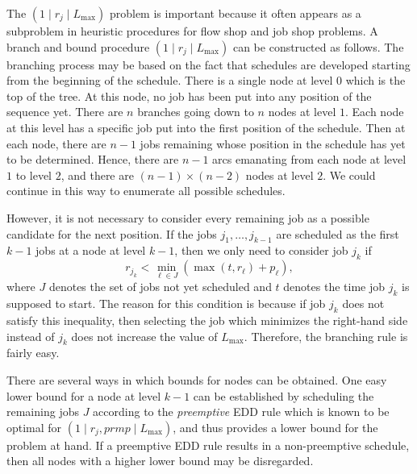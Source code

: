 The $(1 \mid r_j \mid L_{\max})$ problem is important because it often 
appears as a subproblem in heuristic procedures for flow shop and job shop 
problems. A branch and bound procedure $(1 \mid r_j \mid L_{\max})$ 
can be constructed as follows. The branching process may be based on the 
fact that schedules are developed starting from the beginning of the schedule. 
There is a single node at level $0$ which is the top of the tree. At this 
node, no job has been put into any position of the sequence yet. There are 
$n$ branches going down to $n$ nodes at level $1$. Each node at this level 
has a specific job put into the first position of the schedule. Then
at each node, there are $n-1$ jobs remaining whose position in the schedule 
has yet to be determined. Hence, there are $n-1$ arcs emanating from each 
node at level $1$ to level $2$, and there are $(n-1) \times (n-2)$ nodes at 
level $2$. We could continue in this way to enumerate all possible schedules. 

However, it is not necessary to consider every remaining job as a possible 
candidate for the next position. If the jobs $j_1, \dots, j_{k-1}$ 
are scheduled as the first $k-1$ jobs at a node at level $k-1$, then 
we only need to consider job $j_k$ if 
\[ r_{j_k} < \min_{\ell \in J} \left( \max(t, r_\ell) + p_\ell \right), \] 
where $J$ denotes the set of jobs not yet scheduled and $t$ denotes the 
time job $j_k$ is supposed to start. The reason for this condition is because 
if job $j_k$ does not satisfy this inequality, then selecting the job 
which minimizes the right-hand side instead of $j_k$ does not increase the 
value of $L_{\max}$. Therefore, the branching rule is fairly easy. 

There are several ways in which bounds for nodes can be obtained. 
One easy lower bound for a node at level $k-1$ can be established by 
scheduling the remaining jobs $J$ according to the \emph{preemptive} 
EDD rule which is known to be optimal for $(1 \mid r_j, prmp \mid 
L_{\max})$, and thus provides a lower bound for the problem at hand. 
If a preemptive EDD rule results in a non-preemptive schedule, then 
all nodes with a higher lower bound may be disregarded. 


